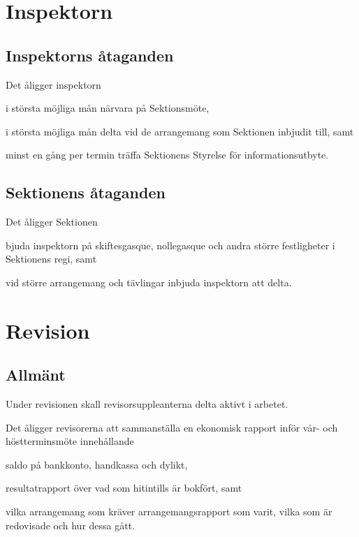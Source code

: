 \documentclass[10pt]{article}
\begin{document}
\section{Inspektorn} %
\subsection{Inspektorns åtaganden}
Det åligger inspektorn

\begin{attlist}
    \item i största möjliga mån närvara på Sektionsmöte,
    \item i största möjliga mån delta vid de arrangemang som Sektionen
        inbjudit till, samt
    \item minst en gång per termin träffa Sektionens Styrelse för
        informationsutbyte.
\end{attlist}

\subsection{Sektionens åtaganden}
Det åligger Sektionen
\begin{attlist}
    \item bjuda inspektorn på skiftesgasque, nollegasque och andra större
        festligheter i Sektionens regi, samt
    \item vid större arrangemang och tävlingar inbjuda inspektorn att delta.
\end{attlist}

\section{Revision} %
\subsection{Allmänt}
Under revisionen skall revisorsuppleanterna delta aktivt i arbetet.

Det åligger revisorerna att sammanställa en ekonomisk rapport inför vår-
och höstterminsmöte innehållande
\begin{alphlist}
    \item saldo på bankkonto, handkassa och dylikt,
    \item resultatrapport över vad som hitintills är bokfört, samt
    \item vilka arrangemang som kräver arrangemangsrapport som varit,
        vilka som är redovisade och hur dessa gått.
\end{alphlist}
\end{document}
